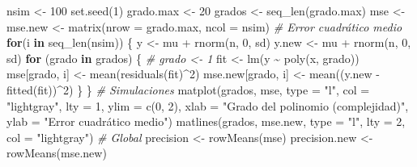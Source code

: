 \documentclass[
]{book}
\newenvironment{Shaded}{\begin{snugshade}}{\end{snugshade}}
\newcommand{\AttributeTok}[1]{\textcolor[rgb]{0.77,0.63,0.00}{#1}}
\newcommand{\CommentTok}[1]{\textcolor[rgb]{0.56,0.35,0.01}{\textit{#1}}}
\newcommand{\ControlFlowTok}[1]{\textcolor[rgb]{0.13,0.29,0.53}{\textbf{#1}}}
\newcommand{\DecValTok}[1]{\textcolor[rgb]{0.00,0.00,0.81}{#1}}
\newcommand{\FunctionTok}[1]{\textcolor[rgb]{0.00,0.00,0.00}{#1}}
\newcommand{\NormalTok}[1]{#1}
\newcommand{\OtherTok}[1]{\textcolor[rgb]{0.56,0.35,0.01}{#1}}
\newcommand{\SpecialCharTok}[1]{\textcolor[rgb]{0.00,0.00,0.00}{#1}}
\newcommand{\StringTok}[1]{\textcolor[rgb]{0.31,0.60,0.02}{#1}}
\theoremstyle{break}
\theoremstyle{definition}
\theoremstyle{definition}
\theoremstyle{definition}
\theoremstyle{definition}
\theoremstyle{remark}
\begin{document}
\begin{Shaded}
\begin{Highlighting}[]
\NormalTok{nsim }\OtherTok{\textless{}{-}} \DecValTok{100}
\FunctionTok{set.seed}\NormalTok{(}\DecValTok{1}\NormalTok{)}
\NormalTok{grado.max }\OtherTok{\textless{}{-}} \DecValTok{20}
\NormalTok{grados }\OtherTok{\textless{}{-}} \FunctionTok{seq\_len}\NormalTok{(grado.max) }
\NormalTok{mse }\OtherTok{\textless{}{-}}\NormalTok{ mse.new }\OtherTok{\textless{}{-}} \FunctionTok{matrix}\NormalTok{(}\AttributeTok{nrow =}\NormalTok{ grado.max, }\AttributeTok{ncol =}\NormalTok{ nsim) }\CommentTok{\# Error cuadrático medio}
\ControlFlowTok{for}\NormalTok{(i }\ControlFlowTok{in} \FunctionTok{seq\_len}\NormalTok{(nsim)) \{}
\NormalTok{  y }\OtherTok{\textless{}{-}}\NormalTok{ mu }\SpecialCharTok{+} \FunctionTok{rnorm}\NormalTok{(n, }\DecValTok{0}\NormalTok{, sd)}
\NormalTok{  y.new }\OtherTok{\textless{}{-}}\NormalTok{ mu }\SpecialCharTok{+} \FunctionTok{rnorm}\NormalTok{(n, }\DecValTok{0}\NormalTok{, sd)}
  \ControlFlowTok{for}\NormalTok{ (grado }\ControlFlowTok{in}\NormalTok{ grados) \{ }\CommentTok{\# grado \textless{}{-} 1}
\NormalTok{    fit }\OtherTok{\textless{}{-}} \FunctionTok{lm}\NormalTok{(y }\SpecialCharTok{\textasciitilde{}} \FunctionTok{poly}\NormalTok{(x, grado))}
\NormalTok{    mse[grado, i] }\OtherTok{\textless{}{-}} \FunctionTok{mean}\NormalTok{(}\FunctionTok{residuals}\NormalTok{(fit)}\SpecialCharTok{\^{}}\DecValTok{2}\NormalTok{)}
\NormalTok{    mse.new[grado, i] }\OtherTok{\textless{}{-}} \FunctionTok{mean}\NormalTok{((y.new }\SpecialCharTok{{-}} \FunctionTok{fitted}\NormalTok{(fit))}\SpecialCharTok{\^{}}\DecValTok{2}\NormalTok{)}
\NormalTok{  \}}
\NormalTok{\}}
\CommentTok{\# Simulaciones}
\FunctionTok{matplot}\NormalTok{(grados, mse, }\AttributeTok{type =} \StringTok{"l"}\NormalTok{, }\AttributeTok{col =} \StringTok{"lightgray"}\NormalTok{, }\AttributeTok{lty =} \DecValTok{1}\NormalTok{, }\AttributeTok{ylim =} \FunctionTok{c}\NormalTok{(}\DecValTok{0}\NormalTok{, }\DecValTok{2}\NormalTok{),}
        \AttributeTok{xlab =} \StringTok{"Grado del polinomio (complejidad)"}\NormalTok{,}
        \AttributeTok{ylab =} \StringTok{"Error cuadrático medio"}\NormalTok{)}
\FunctionTok{matlines}\NormalTok{(grados, mse.new, }\AttributeTok{type =} \StringTok{"l"}\NormalTok{, }\AttributeTok{lty =} \DecValTok{2}\NormalTok{, }\AttributeTok{col =} \StringTok{"lightgray"}\NormalTok{) }
\CommentTok{\# Global}
\NormalTok{precision }\OtherTok{\textless{}{-}} \FunctionTok{rowMeans}\NormalTok{(mse)}
\NormalTok{precision.new }\OtherTok{\textless{}{-}} \FunctionTok{rowMeans}\NormalTok{(mse.new)}

\end{Highlighting}
\end{Shaded}
\end{document}
